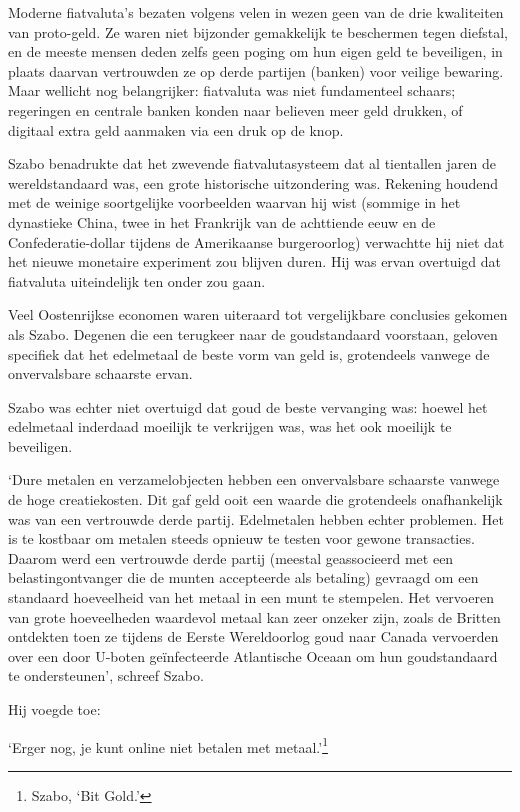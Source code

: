 \documentclass[smalldemyvopaper,11pt,twoside,onecolumn,openright,extrafontsizes,hidelinks]{memoir}
\begin{document}
Moderne fiatvaluta's bezaten volgens velen in wezen geen van de drie
kwaliteiten van proto-geld. Ze waren niet bijzonder gemakkelijk te
beschermen tegen diefstal, en de meeste mensen deden zelfs geen poging
om hun eigen geld te beveiligen, in plaats daarvan vertrouwden ze op
derde partijen (banken) voor veilige bewaring. Maar wellicht nog
belangrijker: fiatvaluta was niet fundamenteel schaars; regeringen en
centrale banken konden naar believen meer geld drukken, of digitaal
extra geld aanmaken via een druk op de knop.

Szabo benadrukte dat het zwevende fiatvalutasysteem dat al tientallen
jaren de wereldstandaard was, een grote historische uitzondering was.
Rekening houdend met de weinige soortgelijke voorbeelden waarvan hij
wist (sommige in het dynastieke China, twee in het Frankrijk van de
achttiende eeuw en de Confederatie-dollar tijdens de Amerikaanse
burgeroorlog) verwachtte hij niet dat het nieuwe monetaire experiment
zou blijven duren. Hij was ervan overtuigd dat fiatvaluta uiteindelijk
ten onder zou gaan.

Veel Oostenrijkse economen waren uiteraard tot vergelijkbare conclusies
gekomen als Szabo. Degenen die een terugkeer naar de goudstandaard
voorstaan, geloven specifiek dat het edelmetaal de beste vorm van geld
is, grotendeels vanwege de onvervalsbare schaarste ervan.

Szabo was echter niet overtuigd dat goud de beste vervanging was: hoewel
het edelmetaal inderdaad moeilijk te verkrijgen was, was het ook
moeilijk te beveiligen.

`Dure metalen en verzamelobjecten hebben een onvervalsbare schaarste
vanwege de hoge creatiekosten. Dit gaf geld ooit een waarde die
grotendeels onafhankelijk was van een vertrouwde derde partij.
Edelmetalen hebben echter problemen. Het is te kostbaar om metalen
steeds opnieuw te testen voor gewone transacties. Daarom werd een
vertrouwde derde partij (meestal geassocieerd met een belastingontvanger
die de munten accepteerde als betaling) gevraagd om een standaard
hoeveelheid van het metaal in een munt te stempelen. Het vervoeren van
grote hoeveelheden waardevol metaal kan zeer onzeker zijn, zoals de
Britten ontdekten toen ze tijdens de Eerste Wereldoorlog goud naar
Canada vervoerden over een door U-boten geïnfecteerde Atlantische Oceaan
om hun goudstandaard te ondersteunen', schreef Szabo.

Hij voegde toe:

`Erger nog, je kunt online niet betalen met metaal.'\footnote{Szabo,
  `Bit Gold.'}
\end{document}

